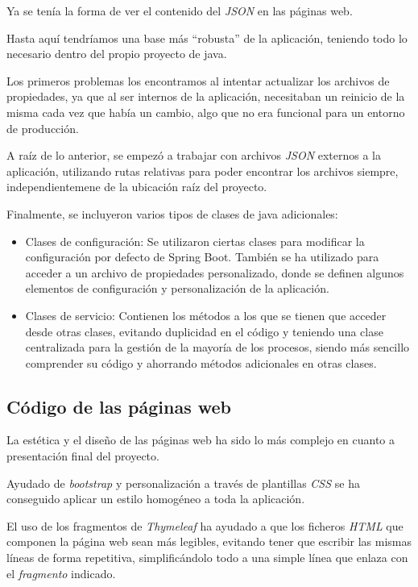 Ya se tenía la forma de ver el contenido del \textit{JSON} en las páginas web.

Hasta aquí tendríamos una base más ``robusta'' de la aplicación, teniendo todo lo necesario dentro del propio proyecto de java.

Los primeros problemas los encontramos al intentar actualizar los archivos de propiedades, ya que al ser internos de la aplicación, necesitaban un reinicio de la misma cada vez que había un cambio, algo que no era funcional para un entorno de producción.

A raíz de lo anterior, se empezó a trabajar con archivos \textit{JSON} externos a la aplicación, utilizando rutas relativas para poder encontrar los archivos siempre, independientemene de la ubicación raíz del proyecto.

Finalmente, se incluyeron varios tipos de clases de java adicionales:

 \begin{itemize}
	\item Clases de configuración: Se utilizaron ciertas clases para modificar la configuración por defecto de Spring Boot. También se ha utilizado para acceder a un archivo de propiedades personalizado, donde se definen algunos elementos de configuración y personalización de la aplicación.
	\item Clases de servicio: Contienen los métodos a los que se tienen que acceder desde otras clases, evitando duplicidad en el código y teniendo una clase centralizada para la gestión de la mayoría de los procesos, siendo más sencillo comprender su código y ahorrando métodos adicionales en otras clases.
\end{itemize}

\subsection{Código de las páginas web}

La estética y el diseño de las páginas web ha sido lo más complejo en cuanto a presentación final del proyecto.

Ayudado de \textit{bootstrap} y personalización a través de plantillas \textit{CSS} se ha conseguido aplicar un estilo homogéneo a toda la aplicación.

El uso de los fragmentos de \textit{Thymeleaf} ha ayudado a que los ficheros \textit{HTML} que componen la página web sean más legibles, evitando tener que escribir las mismas líneas de forma repetitiva, simplificándolo todo a una simple línea que enlaza con el \textit{fragmento} indicado.

